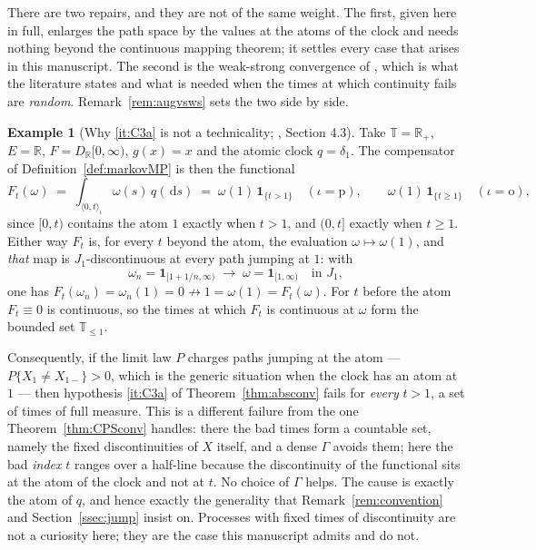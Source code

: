 \documentclass[11pt,a4paper]{article}
\theoremstyle{plain}
\theoremstyle{definition}
\newtheorem{example}[theorem]{Example}
\theoremstyle{remark}
\newcommand{\R}{\mathbb{R}}
\newcommand{\Rp}{\R_+}
\newcommand{\T}{\mathbb{T}}                     %
\newcommand{\one}{\mathbf{1}}
\newcommand{\dif}{\,\mathrm{d}}
\newcommand{\EK}{\cite{EK86}}
\newcommand{\CPS}{\cite{CPS23}}
\begin{document}
There are two repairs, and they are not of the same weight.  The first, given
here in full, enlarges the path space by the values at the atoms of the clock and
needs nothing beyond the continuous mapping theorem; it settles every case that
arises in this manuscript.  The second is the weak-strong convergence of \CPS,
which is what the literature states and what is needed when the times at which
continuity fails are \emph{random}.  Remark~\ref{rem:augvsws} sets the two side
by side.

\begin{example}[Why \ref{it:C3a} is not a technicality; \CPS, Section 4.3]
  \label{ex:atomicdiscontinuity}
  Take $\T = \Rp$, $E = \R$, $F = D_\R[0,\infty)$, $g(x) = x$ and the atomic clock
  $q = \delta_1$.  The compensator of Definition~\ref{def:markovMP} is then the
  functional
  \[
    F_t(\omega) \;=\; \int_{\langle 0,t \rangle_{\iota}} \omega(s) \, q(\dif s)
      \;=\; \omega(1) \, \one_{\{t > 1\}}
      \quad (\iota = \mathrm{p}) ,
      \qquad
      \omega(1) \, \one_{\{t \geq 1\}} \quad (\iota = \mathrm{o}) ,
  \]
  since $[0,t)$ contains the atom $1$ exactly when $t > 1$, and $(0,t]$ exactly
  when $t \geq 1$.  Either way $F_t$ is, for every $t$ beyond the atom, the
  evaluation $\omega \mapsto \omega(1)$, and \emph{that} map is $J_1$-discontinuous
  at every path jumping at $1$: with
  \[
    \omega_n = \one_{[1+1/n,\infty)} \;\longrightarrow\; \omega = \one_{[1,\infty)}
    \quad\text{in } J_1 ,
  \]
  one has $F_t(\omega_n) = \omega_n(1) = 0 \not\to 1 = \omega(1) = F_t(\omega)$.
  For $t$ before the atom $F_t \equiv 0$ is continuous, so the times at which
  $F_t$ is continuous at $\omega$ form the bounded set $\T_{\leq 1}$.

  Consequently, if the limit law $P$ charges paths jumping at the atom ---
  $P\{X_1 \neq X_{1-}\} > 0$, which is the generic situation when the clock has an
  atom at $1$ --- then hypothesis \ref{it:C3a} of Theorem~\ref{thm:absconv} fails
  for \emph{every} $t > 1$, a set of times of full measure.  This is a different
  failure from the one Theorem~\ref{thm:CPSconv} handles: there the bad times form
  a countable set, namely the fixed discontinuities of $X$ itself, and a dense
  $\Gamma$ avoids them; here the bad \emph{index} $t$ ranges over a half-line
  because the discontinuity of the functional sits at the atom of the clock and
  not at $t$.  No choice of $\Gamma$ helps.  The cause is exactly the atom of $q$,
  and hence exactly the generality that Remark~\ref{rem:convention} and
  Section~\ref{ssec:jump} insist on.  Processes with fixed times of discontinuity
  are not a curiosity here; they are the case this manuscript admits and \EK{} do
  not.
\end{example}
\end{document}
